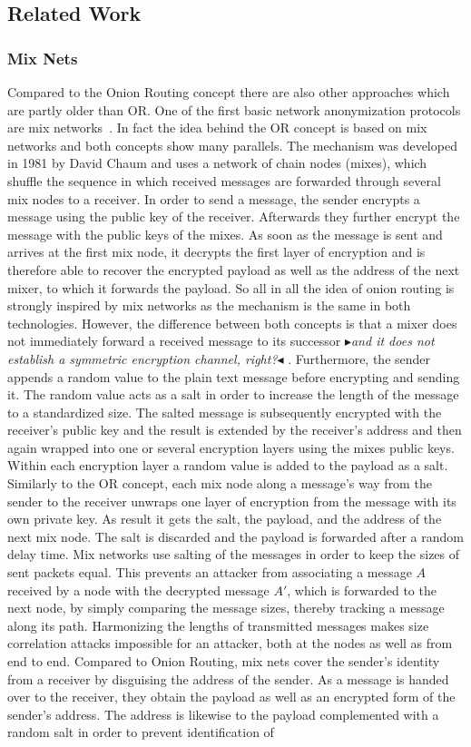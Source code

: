 \documentclass{sig-alternate}
\newcommand{\boxedtext}[1]{\fbox{\scriptsize\bfseries\textsf{#1}}}
\newcommand{\nota}[2]{
   \boxedtext{#1}
       {\small$\blacktriangleright$\emph{\textsl{#2}}$\blacktriangleleft$}
}
\newcommand\fk[1]{\nota{FK}{#1}}
\begin{document}
\subsection {Related Work}
 \subsubsection {Mix Nets}
Compared to the Onion Routing concept there are also other approaches which are partly older than OR. One of the first basic network anonymization protocols are mix networks~\cite{chaum1981untraceable}. In fact the idea behind the OR concept is based on mix networks and both concepts show many parallels. The mechanism was developed in 1981 by David Chaum and uses a network of chain nodes (mixes), which shuffle the sequence in which received messages are forwarded through several mix nodes to a receiver. In order to send a message, the sender encrypts a message using the public key of the receiver. Afterwards they further encrypt the message with the public keys of the mixes. As soon as the message is sent and arrives at the first mix node, it decrypts the first layer of encryption and is therefore able to recover the encrypted payload as well as the address of the next mixer, to which it forwards the payload. So all in all the idea of onion routing is strongly inspired by mix networks as the mechanism is the same in both technologies. However, the difference between both concepts is that a mixer does not immediately forward a received message to its successor\fk{and it does not establish a symmetric encryption channel, right?}. Furthermore, the sender appends a random value to the plain text message before encrypting and sending it. The random value acts as a salt in order to increase the length of the message to a standardized size. The salted message is subsequently encrypted with the receiver's public key and the result is extended by the receiver's address and then again wrapped into one or several encryption layers using the mixes public keys. Within each encryption layer a random value is added to the payload as a salt. Similarly to the OR concept, each mix node along a message's way from the sender to the receiver unwraps one layer of encryption from the message with its own private key. As result it gets the salt, the payload, and the address of the next mix node. The salt is discarded and the payload is forwarded after a random delay time. Mix networks use salting of the messages in order to keep the sizes of sent packets equal. This prevents an attacker from associating a message $A$ received by a node with the decrypted message $ A' $, which is forwarded to the next node, by simply comparing the message sizes, thereby tracking a message along its path. Harmonizing the lengths of transmitted messages makes size correlation attacks impossible for an attacker, both at the nodes as well as from end to end. Compared to Onion Routing, mix nets cover the sender's identity from a receiver by disguising the address of the sender. As a message is handed over to the receiver, they obtain the payload as well as an encrypted form of the sender's address. The address is likewise to the payload complemented with a random salt in order to prevent identification of 
\end{document}
